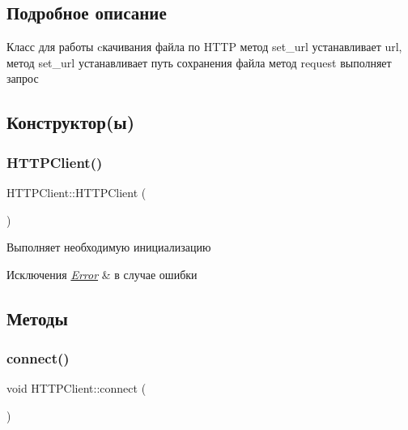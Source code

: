 \subsection{Подробное описание}
Класс для работы cкачивания файла по H\+T\+TP метод set\+\_\+url устанавливает url, метод set\+\_\+url устанавливает путь сохранения файла метод request выполняет запрос 

\subsection{Конструктор(ы)}
\mbox{\label{classHTTPClient_a23a15a8f27ac926a86c2ef7bc7bfebcb}} 
\subsubsection{\texorpdfstring{HTTPClient()}{HTTPClient()}}
{\footnotesize\ttfamily H\+T\+T\+P\+Client\+::\+H\+T\+T\+P\+Client (\begin{DoxyParamCaption}{ }\end{DoxyParamCaption})}



Выполняет необходимую инициализацию 


\begin{DoxyExceptions}{Исключения}
{\em \mbox{\hyperlink{classError}{Error}}} & в случае ошибки \\
\hline
\end{DoxyExceptions}


\subsection{Методы}
\mbox{\label{classHTTPClient_a470da28450e7a79f87c16e6f24af15c3}} 
\subsubsection{\texorpdfstring{connect()}{connect()}}
{\footnotesize\ttfamily void H\+T\+T\+P\+Client\+::connect (\begin{DoxyParamCaption}{ }\end{DoxyParamCaption})\hspace{0.3cm}{\ttfamily [private]}}



